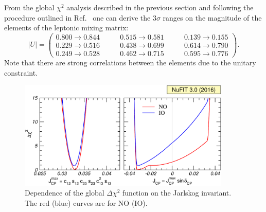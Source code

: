 \documentclass[a4paper, 11pt]{article}
\begin{document}
From the global $\chi^2$ analysis described in the previous section
and following the procedure outlined in
Ref.~\cite{GonzalezGarcia:2003qf} one can derive the $3\sigma$ ranges
on the magnitude of the elements of the leptonic mixing matrix:
%
\begin{equation}
  \label{eq:umatrix}
  |U| = \begin{pmatrix}
    0.800 \to 0.844 &\qquad
    0.515 \to 0.581 &\qquad
    0.139 \to 0.155
    \\
    0.229 \to 0.516 &\qquad
    0.438 \to 0.699 &\qquad
    0.614 \to 0.790
    \\
    0.249 \to 0.528 &\qquad
    0.462 \to 0.715 &\qquad
    0.595 \to 0.776
  \end{pmatrix} .
\end{equation}
%
Note that there are strong correlations between the elements due to
the unitary constraint.

\begin{figure}\centering
  \includegraphics[width=0.9\textwidth]{fig-chisq-viola}
  \caption{Dependence of the global $\Delta\chi^2$ function on the
    Jarlskog invariant. The red (blue) curves are for NO (IO).}
  \label{fig:chisq-viola}
\end{figure}
\end{document}
